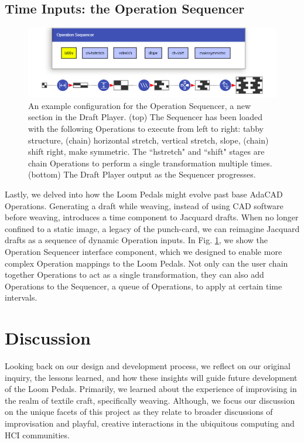 \subsection{Time Inputs: the Operation Sequencer}

\begin{figure}[h]
    \centering
    \includegraphics[width=\linewidth]{figs/LP_sequencer.png}
    \caption[The Operation Sequencer in the modified AdaCAD interface.]{An example configuration for the Operation Sequencer, a new section in the Draft Player. (top) The Sequencer has been loaded with the following Operations to execute from left to right: tabby structure, (chain) horizontal stretch, vertical stretch, slope, (chain) shift right, make symmetric. The ``hstretch" and ``shift" stages are chain Operations to perform a single transformation multiple times. (bottom) The Draft Player output as the Sequencer progresses.}
    \label{fig:sequencer}
\end{figure}


Lastly, we delved into how the Loom Pedals might evolve past base AdaCAD Operations. Generating a draft while weaving, instead of using CAD software before weaving, introduces a time component to Jacquard drafts. When no longer confined to a static image, a legacy of the punch-card, we can reimagine Jacquard drafts as a sequence of dynamic Operation inputs. In Fig. \ref{fig:sequencer}, we show the Operation Sequencer interface component, which we designed to enable more complex Operation mappings to the Loom Pedals. Not only can the user chain together Operations to act as a single transformation, they can also add Operations to the Sequencer, a queue of Operations, to apply at certain time intervals.

\section{Discussion}
\label{sect-discussion}

Looking back on our design and development process, we reflect on our original inquiry, the lessons learned, and how these insights will guide future development of the Loom Pedals. Primarily, we learned about the experience of improvising in the realm of textile craft, specifically weaving. Although, we focus our discussion on the unique facets of this project as they relate to broader discussions of improvisation and playful, creative interactions in the ubiquitous computing and HCI communities.

